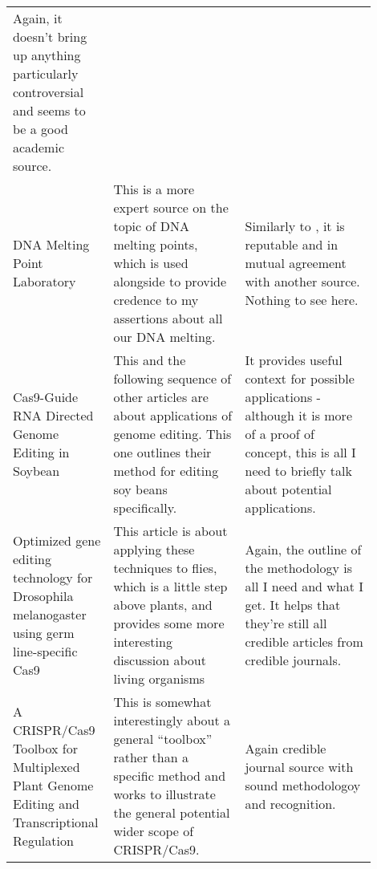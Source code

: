 \documentclass[a4paper,11pt]{article}
\begin{document}
\begin{center}
{\begin{longtable}{p{0.2\linewidth} p{0.35\linewidth} p{0.35\linewidth}}
    Again, it doesn't bring up anything particularly controversial and seems to
    be a good academic source.

    \\

    DNA Melting Point Laboratory \cite{MeltingPoint1980Pitkin} &

    This is a more expert source on the topic of DNA melting points, which is
    used alongside \cite{MeltingCurve1979Azbel} to provide credence to my
    assertions about all our DNA melting. &

    Similarly to \cite{MeltingCurve1979Azbel}, it is reputable and in mutual
    agreement with another source. Nothing to see here.

    \\

    Cas9-Guide RNA Directed Genome Editing in Soybean \cite{Soybean2015Li} &

    This and the following sequence of other articles are about applications of
    genome editing. This one outlines their method for editing soy beans
    specifically. &

    It provides useful context for possible applications - although it is more
    of a proof of concept, this is all I need to briefly talk about potential
    applications.

    \\

    Optimized gene editing technology for Drosophila melanogaster using germ
    line-specific Cas9 \cite{Flies2013Ren} &

    This article is about applying these techniques to flies, which is a little
    step above plants, and provides some more interesting discussion about
    living organisms &

    Again, the outline of the methodology is all I need and what I get. It helps
    that they're still all credible articles from credible journals.

    \\

    A CRISPR/Cas9 Toolbox for Multiplexed Plant Genome Editing and
    Transcriptional Regulation \cite{PlantToolbox2015Lowder} &

    This is somewhat interestingly about a general ``toolbox'' rather than a
    specific method and works to illustrate the general potential wider scope of
    CRISPR/Cas9. &

    Again credible journal source with sound methodologoy and recognition.


\end{longtable}}
\end{center}
\end{document}
